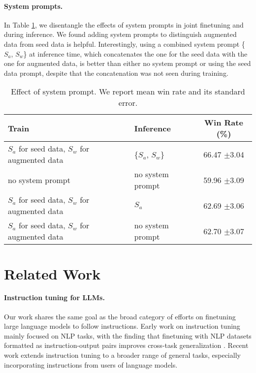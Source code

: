\paragraph{System prompts.}
In Table \ref{tab:abl_system_prompt}, we disentangle the effects of system prompts in joint finetuning and during inference. We found adding system prompts to distinguish augmented data from seed data is helpful. Interestingly, using a combined system prompt \{$S_a$, $S_w$\} at inference time, which concatenates the one for the seed data with the one for augmented data, is better than either no system prompt or using the seed data prompt, despite that the concatenation was not seen during training.  
\begin{table}[t]
\caption{Effect of system prompt. We report mean win rate and its standard error.
\label{tab:abl_system_prompt}
}
  \centering
  \begin{tabular}{llc}
    \toprule
     \textbf{Train} & \textbf{Inference}    &  \textbf{Win Rate (\%)}  \\
    \midrule
    $S_a$ for seed data, $S_w$ for augmented data  & \{$S_a$, $S_w$\}  & 
66.47 $\pm$3.04 \\ 

    \midrule
   no system prompt  &  no system prompt & 59.96 $\pm$3.09   \\
    $S_a$ for seed data, $S_w$ for augmented data  & $S_a$ &  62.69 $\pm$3.06   \\
    $S_a$ for seed data, $S_w$ for augmented data   & no system prompt &   62.70 $\pm$3.07   \\
    
    \bottomrule
  \end{tabular}

\end{table}

\section{Related Work}

\paragraph{Instruction tuning for LLMs.} Our work shares the same goal as the broad category of efforts on finetuning large language models to follow instructions. Early work on instruction tuning mainly focused on NLP tasks, with the finding that finetuning with NLP datasets formatted as instruction-output pairs improves cross-task generalization \citep{wei2021finetuned,mishra2021cross,sanh2021multitask,wang2022super}. Recent work \citet{ouyang2022training} extends instruction tuning to a broader range of general tasks, especially incorporating instructions from users of language models.

